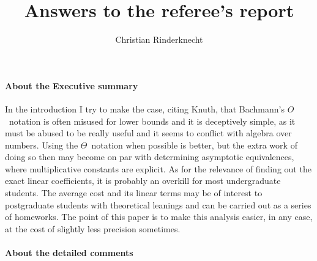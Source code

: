 \documentclass[10pt]{article}
\title{Answers to the referee's report}
\author{Christian Rinderknecht}
\date{}
\begin{document}
\maketitle

\allowdisplaybreaks

\paragraph{About the Executive summary} In the introduction I try to
make the case, citing Knuth, that Bachmann's \(O\)~notation is often misused for lower bounds and it is
deceptively simple, as it must be abused to be really useful and it
seems to conflict with algebra over numbers. Using the
\(\Theta\)~notation when possible is better, but the extra work of
doing so then may become on par with determining asymptotic
equivalences, where multiplicative constants are explicit. As for the
relevance of finding out the exact linear coefficients, it is probably
an overkill for most undergraduate students. The average cost and its
linear terms may be of interest to postgraduate students with
theoretical leanings and can be carried out as a series of
homeworks. The point of this paper is to make this analysis easier, in
any case, at the cost of slightly less precision sometimes.

\paragraph{About the detailed comments}
\end{document}
